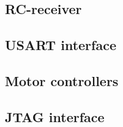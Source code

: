 \documentclass[11pt, a4paper]{article}
\begin{document}
\subsection{RC-receiver} %
\label{sub:RC-receiver}


\subsection{USART interface} %
\label{sub:USART interface}


\subsection{Motor controllers} %
\label{sub:Motor controllers}


\subsection{JTAG interface} %
\label{sub:JTAG interface}

\end{document}
